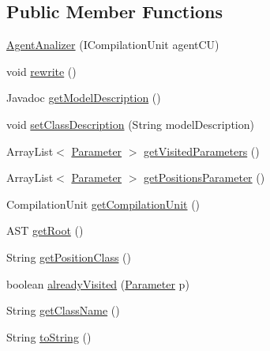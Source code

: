 \subsection*{Public Member Functions}
\begin{DoxyCompactItemize}
\item 
\hyperlink{classit_1_1isislab_1_1masonhelperdocumentation_1_1analizer_1_1_agent_analizer_adc8b62d98bb421e6baa3373f3694fee8}{Agent\-Analizer} (I\-Compilation\-Unit agent\-C\-U)
\item 
void \hyperlink{classit_1_1isislab_1_1masonhelperdocumentation_1_1analizer_1_1_agent_analizer_aa330ee12112641e1ba3d9acedb9401b9}{rewrite} ()
\item 
Javadoc \hyperlink{classit_1_1isislab_1_1masonhelperdocumentation_1_1analizer_1_1_agent_analizer_a4a819d1324aa806e8bc729bb5d6ce398}{get\-Model\-Description} ()
\item 
void \hyperlink{classit_1_1isislab_1_1masonhelperdocumentation_1_1analizer_1_1_agent_analizer_a1dcc3313d7fe6fa67fd3c27433b78763}{set\-Class\-Description} (String model\-Description)
\item 
Array\-List$<$ \hyperlink{classit_1_1isislab_1_1masonhelperdocumentation_1_1analizer_1_1_parameter}{Parameter} $>$ \hyperlink{classit_1_1isislab_1_1masonhelperdocumentation_1_1analizer_1_1_agent_analizer_aed0a62fd5108f41992ade938d6bcd9cc}{get\-Visited\-Parameters} ()
\item 
Array\-List$<$ \hyperlink{classit_1_1isislab_1_1masonhelperdocumentation_1_1analizer_1_1_parameter}{Parameter} $>$ \hyperlink{classit_1_1isislab_1_1masonhelperdocumentation_1_1analizer_1_1_agent_analizer_aa2e85956f4a23176c398294cf02d859d}{get\-Positions\-Parameter} ()
\item 
Compilation\-Unit \hyperlink{classit_1_1isislab_1_1masonhelperdocumentation_1_1analizer_1_1_agent_analizer_af956b9fdd9d6b6b97d4982cba816d441}{get\-Compilation\-Unit} ()
\item 
A\-S\-T \hyperlink{classit_1_1isislab_1_1masonhelperdocumentation_1_1analizer_1_1_agent_analizer_a32883fb3c910d96ba584549d27856ce1}{get\-Root} ()
\item 
String \hyperlink{classit_1_1isislab_1_1masonhelperdocumentation_1_1analizer_1_1_agent_analizer_a5f65d6f8f8c1a00b0b66fb3dd0ab37cb}{get\-Position\-Class} ()
\item 
boolean \hyperlink{classit_1_1isislab_1_1masonhelperdocumentation_1_1analizer_1_1_agent_analizer_a6be22d4f751e44b18796b10767b581d5}{already\-Visited} (\hyperlink{classit_1_1isislab_1_1masonhelperdocumentation_1_1analizer_1_1_parameter}{Parameter} p)
\item 
String \hyperlink{classit_1_1isislab_1_1masonhelperdocumentation_1_1analizer_1_1_agent_analizer_ace466e16439878a851eb63d5a11ddf43}{get\-Class\-Name} ()
\item 
String \hyperlink{classit_1_1isislab_1_1masonhelperdocumentation_1_1analizer_1_1_agent_analizer_aea58a6f4ec614b3778588784cb250dcb}{to\-String} ()
\end{DoxyCompactItemize}
